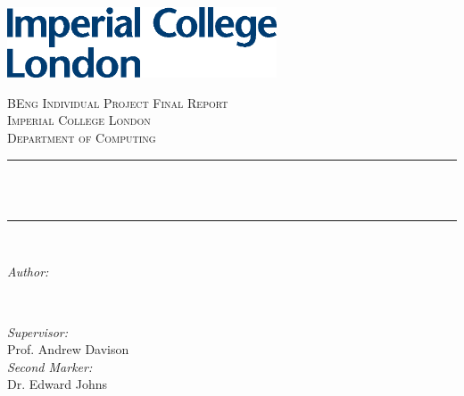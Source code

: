 \begin{titlepage}

\newcommand{\HRule}{\rule{\linewidth}{0.5mm}}


\includegraphics[width=8cm]{title/logo.eps}\\[1cm] %
 

\center %


\textsc{\LARGE BEng Individual Project Final Report}\\[1.5cm]
\textsc{\Large Imperial College London}\\[0.5cm]
\textsc{\large Department of Computing}\\[0.5cm]

\makeatletter
\HRule \\[0.4cm]
{ \huge \bfseries \@title}\\[0.4cm] %
\HRule \\[1.5cm]
 

\begin{minipage}{0.4\textwidth}
\begin{flushleft} \large
\emph{Author:}\\
\@author %
\end{flushleft}
\end{minipage}
~
\begin{minipage}{0.4\textwidth}
\begin{flushright} \large
\emph{Supervisor:} \\
Prof. Andrew Davison \\[1.2em]
\emph{Second Marker:} \\
Dr. Edward Johns \\[1.2em]
\end{flushright}
\end{minipage}\\[2cm]
\makeatother


\end{titlepage}
